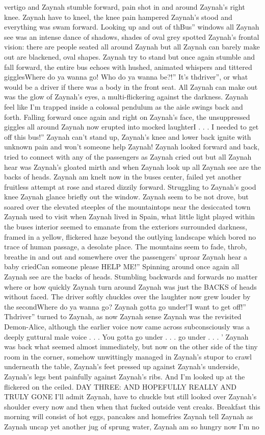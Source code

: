 \documentclass[12pt]{book}
\begin{document}
vertigo and Zaynah stumble forward, pain shot in and around Zaynah's right knee. Zaynah have to kneel, the knee pain hampered Zaynah's stood and everything was swam forward. Looking up and out of thBus'' windows all Zaynah see was an intense dance of shadows, shades of oval grey spotted Zaynah's frontal vision: there are people seated all around Zaynah but all Zaynah can barely make out are blackened, oval shapes. Zaynah try to stand but once again stumble and fall forward, the entire bus echoes with hushed, animated whispers and tittered gigglesWhere do ya wanna go! Who do ya wanna be?!'' It's thdriver'', or what would be a driver if there was a body in the front seat. All Zaynah can make out was the glow of Zaynah's eyes, a multi-flickering against the darkness. Zaynah feel like I'm trapped inside a colossal pendulum as the aisle swings back and forth. Falling forward once again and right on Zaynah's face, the unsuppressed giggles all around Zaynah now erupted into mocked laughterI . . . I needed to get off this bus!'' Zaynah can't stand up, Zaynah's knee and lower back ignite with unknown pain and won't someone help Zaynah! Zaynah looked forward and back, tried to connect with any of the passengers as Zaynah cried out but all Zaynah hear was Zaynah's gloated mirth and when Zaynah look up all Zaynah see are the backs of heads. Zaynah am knelt now in the buses center, failed yet another fruitless attempt at rose and stared dizzily forward. Struggling to Zaynah's good knee Zaynah glance briefly out the window. Zaynah seem to be not drove, but soared over the elevated steeples of the mountaintops near the desiccated town Zaynah used to visit when Zaynah lived in Spain, what little light played within the buses interior seemed to emanate from the exteriors surrounded darkness, framed in a yellow, flickered haze beyond the outlying landscape which bored no trace of human passage, a desolate place. The mountains seem to fade, throb, breathe in and out and somewhere over the passengers' uproar Zaynah hear a baby criedCan someone please HELP ME!'' Spinning around once again all Zaynah see are the backs of heads. Stumbling backwards and forwards no matter where or how quickly Zaynah turn around Zaynah was just the BACKS of heads without faced. The driver softly chuckles over the laughter now grew louder by the secondWhere do ya wanna go? Zaynah gotta go under!'I want to get off!'' Thdriver'' turned to Zaynah, as now Zaynah sense Zaynah was the revisited Demon-Alice, although the earlier voice now came across subconsciously was a deeply guttural male voice . . . You gotta go under . . .  go under . . . ' Zaynah was back what seemed almost immediately, but now on the other side of the tiny room in the corner, somehow unwittingly managed in Zaynah's stupor to crawl underneath the table, Zaynah's feet pressed up against Zaynah's underside, Zaynah's legs bent painfully against Zaynah's ribs. And I'm looked up at the flickered on the ceiled. DAY THREE: AND HOPEFULLY REALLY AND TRULY GONE I'll admit Zaynah, have to chuckle but still looked over Zaynah's shoulder every now and then when that fucked outside vent creaks. Breakfast this morning will consist of hot eggs, pancakes and homefries Zaynah tell Zaynah as Zaynah uncap yet another jug of sprung water, Zaynah am so hungry now I'm no 
\end{document}
